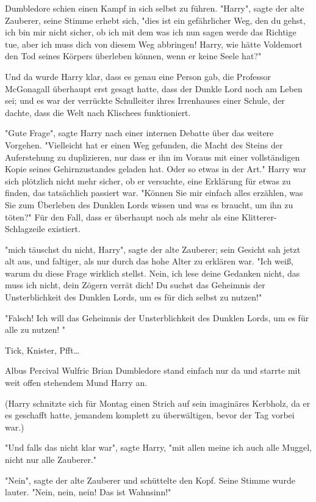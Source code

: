 {Dumbledore schien einen Kampf in sich selbst zu führen. "Harry", sagte der alte Zauberer, seine Stimme erhebt sich, "dies ist ein gefährlicher Weg, den du gehst, ich bin mir nicht sicher, ob ich mit dem was ich nun sagen werde das Richtige tue, aber ich muss dich von diesem Weg abbringen! Harry, wie hätte Voldemort den Tod seines Körpers überleben können, wenn er keine Seele hat?"

Und da wurde Harry klar, dass es genau eine Person gab, die Professor McGonagall überhaupt erst gesagt hatte, dass der Dunkle Lord noch am Leben sei; und es war der verrückte Schulleiter ihres Irrenhauses einer Schule, der dachte, dass die Welt nach Klischees funktioniert.

"Gute Frage", sagte Harry nach einer internen Debatte über das weitere Vorgehen. "Vielleicht hat er einen Weg gefunden, die Macht des Steins der Auferstehung zu duplizieren, nur dass er ihn im Voraus mit einer vollständigen Kopie seines Gehirnzustandes geladen hat. Oder so etwas in der Art." Harry war sich plötzlich nicht mehr sicher, ob er versuchte, eine Erklärung für etwas zu finden, das tatsächlich passiert war. "Können Sie mir einfach alles erzählen, was Sie zum Überleben des Dunklen Lords wissen und was es braucht, um ihn zu töten?" Für den Fall, dass er überhaupt noch als mehr als eine Klitterer-Schlagzeile existiert.

"mich täuschst du nicht, Harry", sagte der alte Zauberer; sein Gesicht sah jetzt alt aus, und faltiger, als nur durch das hohe Alter zu erklären war. "Ich weiß, warum du diese Frage wirklich stellst. Nein, ich lese deine Gedanken nicht, das muss ich nicht, dein Zögern verrät dich! Du suchst das Geheimnis der Unsterblichkeit des Dunklen Lords, um es für dich selbst zu nutzen!"

"Falsch! Ich will das Geheimnis der Unsterblichkeit des Dunklen Lords, um es für alle zu nutzen! "

Tick, Knister, Pfft…

Albus Percival Wulfric Brian Dumbledore stand einfach nur da und starrte mit weit offen stehendem Mund Harry an.

(Harry schnitzte sich für Montag einen Strich auf sein imaginäres Kerbholz, da er es geschafft hatte, jemandem komplett zu überwältigen, bevor der Tag vorbei war.)

"Und falls das nicht klar war", sagte Harry, "mit allen meine ich auch alle Muggel, nicht nur alle Zauberer."

"Nein", sagte der alte Zauberer und schüttelte den Kopf. Seine Stimme wurde lauter. "Nein, nein, nein! Das ist Wahnsinn!"

}
